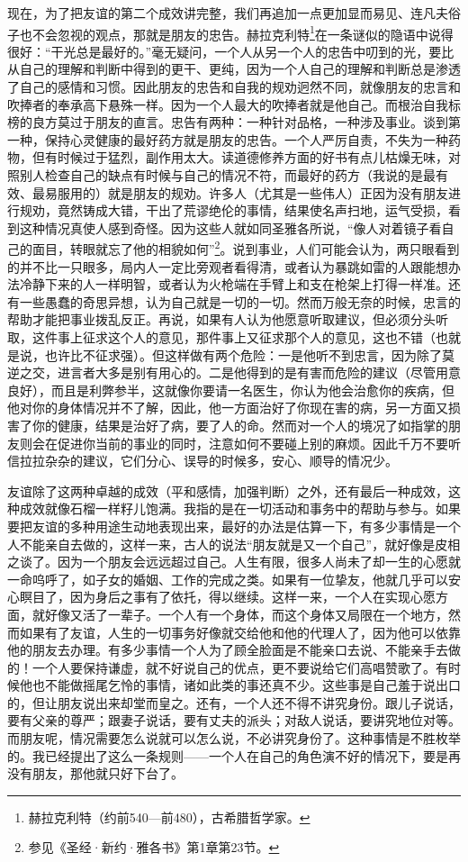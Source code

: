 \par 现在，为了把友谊的第二个成效讲完整，我们再追加一点更加显而易见、连凡夫俗子也不会忽视的观点，那就是朋友的忠告。赫拉克利特\footnote{赫拉克利特（约前540—前480），古希腊哲学家。}在一条谜似的隐语中说得很好：“干光总是最好的。”毫无疑问，一个人从另一个人的忠告中叨到的光，要比从自己的理解和判断中得到的更干、更纯，因为一个人自己的理解和判断总是渗透了自己的感情和习惯。因此朋友的忠告和自我的规劝迥然不同，就像朋友的忠言和吹捧者的奉承高下悬殊一样。因为一个人最大的吹捧者就是他自己。而根治自我标榜的良方莫过于朋友的直言。忠告有两种：一种针对品格，一种涉及事业。谈到第一种，保持心灵健康的最好药方就是朋友的忠告。一个人严厉自责，不失为一种药物，但有时候过于猛烈，副作用太大。读道德修养方面的好书有点儿枯燥无味，对照别人检查自己的缺点有时候与自己的情况不符，而最好的药方（我说的是最有效、最易服用的）就是朋友的规劝。许多人（尤其是一些伟人）正因为没有朋友进行规劝，竟然铸成大错，干出了荒谬绝伦的事情，结果使名声扫地，运气受损，看到这种情况真使人感到奇怪。因为这些人就如同圣雅各所说，“像人对着镜子看自己的面目，转眼就忘了他的相貌如何”\footnote{参见《圣经·新约·雅各书》第1章第23节。}。说到事业，人们可能会认为，两只眼看到的并不比一只眼多，局内人一定比旁观者看得清，或者认为暴跳如雷的人跟能想办法冷静下来的人一样明智，或者认为火枪端在手臂上和支在枪架上打得一样准。还有一些愚蠢的奇思异想，认为自己就是一切的一切。然而万般无奈的时候，忠言的帮助才能把事业拨乱反正。再说，如果有人认为他愿意听取建议，但必须分头听取，这件事上征求这个人的意见，那件事上又征求那个人的意见，这也不错（也就是说，也许比不征求强）。但这样做有两个危险：一是他听不到忠言，因为除了莫逆之交，进言者大多是别有用心的。二是他得到的是有害而危险的建议（尽管用意良好），而且是利弊参半，这就像你要请一名医生，你认为他会治愈你的疾病，但他对你的身体情况并不了解，因此，他一方面治好了你现在害的病，另一方面又损害了你的健康，结果是治好了病，要了人的命。然而对一个人的境况了如指掌的朋友则会在促进你当前的事业的同时，注意如何不要碰上别的麻烦。因此千万不要听信拉拉杂杂的建议，它们分心、误导的时候多，安心、顺导的情况少。
\par 友谊除了这两种卓越的成效（平和感情，加强判断）之外，还有最后一种成效，这种成效就像石榴一样籽儿饱满。我指的是在一切活动和事务中的帮助与参与。如果要把友谊的多种用途生动地表现出来，最好的办法是估算一下，有多少事情是一个人不能亲自去做的，这样一来，古人的说法“朋友就是又一个自己”，就好像是皮相之谈了。因为一个朋友会远远超过自己。人生有限，很多人尚未了却一生的心愿就一命呜呼了，如子女的婚姻、工作的完成之类。如果有一位挚友，他就几乎可以安心瞑目了，因为身后之事有了依托，得以继续。这样一来，一个人在实现心愿方面，就好像又活了一辈子。一个人有一个身体，而这个身体又局限在一个地方，然而如果有了友谊，人生的一切事务好像就交给他和他的代理人了，因为他可以依靠他的朋友去办理。有多少事情一个人为了顾全脸面是不能亲口去说、不能亲手去做的！一个人要保持谦虚，就不好说自己的优点，更不要说给它们高唱赞歌了。有时候他也不能做摇尾乞怜的事情，诸如此类的事还真不少。这些事是自己羞于说出口的，但让朋友说出来却堂而皇之。还有，一个人还不得不讲究身份。跟儿子说话，要有父亲的尊严；跟妻子说话，要有丈夫的派头；对敌人说话，要讲究地位对等。而朋友呢，情况需要怎么说就可以怎么说，不必讲究身份了。这种事情是不胜枚举的。我已经提出了这么一条规则——一个人在自己的角色演不好的情况下，要是再没有朋友，那他就只好下台了。




